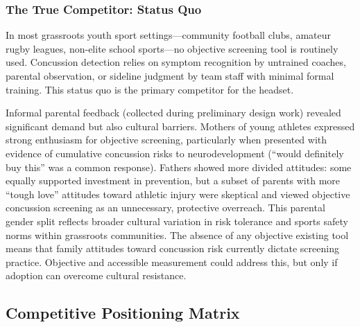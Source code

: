 \subsubsection*{The True Competitor: Status Quo}

In most grassroots youth sport settings---community football clubs, amateur rugby leagues, non-elite school sports---no objective screening tool is routinely used. Concussion detection relies on symptom recognition by untrained coaches, parental observation, or sideline judgment by team staff with minimal formal training. This status quo is the primary competitor for the headset.

Informal parental feedback (collected during preliminary design work) revealed significant demand but also cultural barriers. Mothers of young athletes expressed strong enthusiasm for objective screening, particularly when presented with evidence of cumulative concussion risks to neurodevelopment (``would definitely buy this'' was a common response). Fathers showed more divided attitudes: some equally supported investment in prevention, but a subset of parents with more ``tough love'' attitudes toward athletic injury were skeptical and viewed objective concussion screening as an unnecessary, protective overreach. This parental gender split reflects broader cultural variation in risk tolerance and sports safety norms within grassroots communities. The absence of any objective existing tool means that family attitudes toward concussion risk currently dictate screening practice. Objective and accessible measurement could address this, but only if adoption can overcome cultural resistance.


\subsection{Competitive Positioning Matrix}
\label{sec:ent-positioning-matrix}

